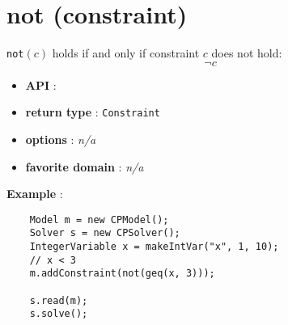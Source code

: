 \label{not}
\hypertarget{not}{}

\section{not (constraint)}\label{not:notconstraint}\hypertarget{not:notconstraint}{}
\begin{notedef}
  \texttt{not}$(c)$ holds if and only if constraint $c$ does not hold:
$$\neg c$$
\end{notedef}
\begin{itemize}
	\item \textbf{API} : 
	\item \textbf{return type} : \texttt{Constraint}
	\item \textbf{options} : \emph{n/a}
	\item \textbf{favorite domain} : \emph{n/a}
\end{itemize}

\textbf{Example} : 
\begin{lstlisting}
	Model m = new CPModel();
	Solver s = new CPSolver();
	IntegerVariable x = makeIntVar("x", 1, 10);
	// x < 3
	m.addConstraint(not(geq(x, 3)));
	
	s.read(m);
	s.solve();
\end{lstlisting}
